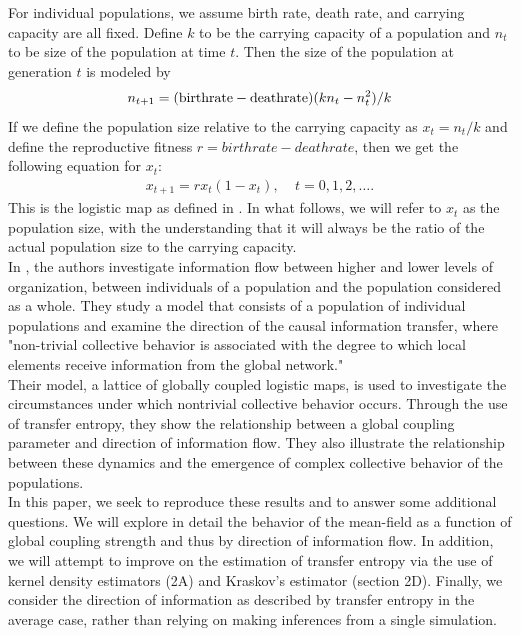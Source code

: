 \documentclass[conference]{IEEEtran}
\begin{document}
\noindent For individual populations, we assume birth rate, death rate, and  carrying capacity are all fixed.  Define $k$ to be the carrying capacity of a population and $n_t$ to be size of the population at time $t$. Then the size of the population at generation $t$ is modeled by 
\begin{eqnarray}
n_{t+1} = (\textnormal{birthrate} - \textnormal{deathrate}) (k n_t - n_t^2) / k 
\end{eqnarray}
If we define the population size relative to the carrying capacity as  $x_t = n_t / k$ and define the reproductive fitness  $r = birthrate - deathrate$, then we  get the following equation for $x_t$: 
\begin{eqnarray}
 x_{t+1} = r  x_t (1 - x_t), \ \ \ \ \  t=0, 1, 2, \ldots . 
\label{logistic}
\end{eqnarray}
This is the logistic map as defined in \cite{Mitchell}.  In what follows, we will refer to $x_t$ as the population size, with the understanding that it will always be the ratio of the actual population size to the carrying capacity. \\

\noindent In \cite{Walker}, the authors investigate information flow between higher and lower levels of organization, between individuals of a population and the population considered as a whole. 
They study a model that consists of a population of individual populations and examine the direction of the causal information transfer, where 
"non-trivial collective behavior is associated with the degree to which local elements receive information from the global network." \cite{Walker} \\

\noindent Their model, a lattice of globally coupled logistic maps, is used to investigate the circumstances under which nontrivial collective behavior occurs. Through the use of transfer entropy, they show the relationship between a global coupling parameter and direction of information flow. They also illustrate the relationship between these dynamics and the emergence of complex collective behavior of the populations.  \\

\noindent In this paper, we seek to reproduce these results and to answer some additional questions. We will explore in detail the behavior of the mean-field as a function of global coupling strength and thus by direction of information flow. In addition, we will attempt to improve on the estimation of transfer entropy via the use of kernel density estimators (2A) and Kraskov's estimator (section 2D). Finally, we consider the direction of information as described by transfer entropy in the average case, rather than relying on making inferences from a single simulation.
\end{document}
